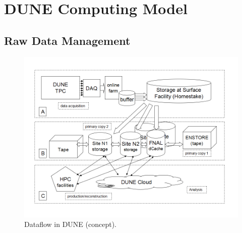 \section{DUNE Computing Model}
\label{sec:computing_model}
\subsection{Raw Data Management}

\begin{figure}[h!]
\centering
\includegraphics[width=\textwidth]{DUNEdataflow.png}
\caption{Dataflow in DUNE (concept).}
\label{fig:DUNEdataflow}
\end{figure}